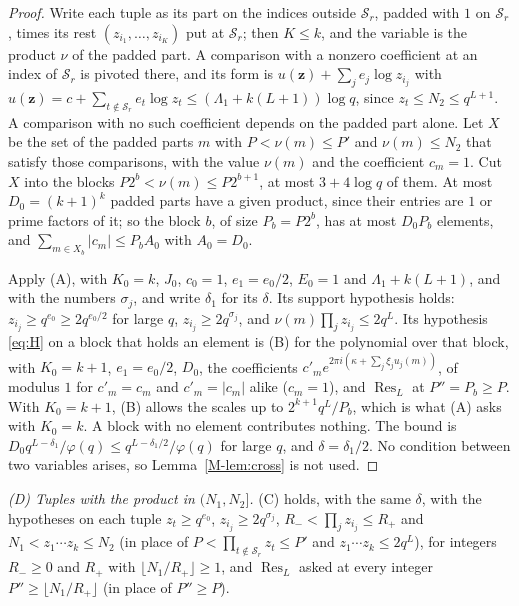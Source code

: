 \documentclass[11pt]{article}
\numberwithin{equation}{section}
\begin{document}
\begin{proof}
Write each tuple as its part on the indices outside $\mathcal S_r$, padded with $1$ on $\mathcal S_r$, times its rest
$(z_{i_1}, \dots, z_{i_K})$ put at $\mathcal S_r$; then $K \le k$, and the variable is the product $\nu$ of the padded
part. A comparison with a nonzero coefficient at an index of $\mathcal S_r$ is pivoted there, and its form is $u(\mathbf
z) + \sum_j e_j \log z_{i_j}$ with $u(\mathbf z) = c + \sum_{t \notin \mathcal S_r} e_t \log z_t \le (\Lambda_1 + k(L +
1))\log q$, since $z_t \le N_2 \le q^{L + 1}$. A comparison with no such coefficient depends on the padded part alone.
Let $X$ be the set of the padded parts $m$ with $P < \nu(m) \le P'$ and $\nu(m) \le N_2$ that satisfy those comparisons,
with the value $\nu(m)$ and the coefficient $c_m = 1$. Cut $X$ into the blocks $P 2^b < \nu(m) \le P 2^{b + 1}$, at most
$3 + 4\log q$ of them. At most $D_0 = (k + 1)^k$ padded parts have a given product, since their entries are $1$ or prime
factors of it; so the block $b$, of size $P_b = P 2^b$, has at most $D_0 P_b$ elements, and $\sum_{m \in X_b} |c_m|
\le P_b A_0$ with $A_0 = D_0$.

Apply (A), with $K_0 = k$, $J_0$, $c_0 = 1$, $e_1 = e_0/2$, $E_0 = 1$ and $\Lambda_1 + k(L + 1)$, and with the numbers
$\sigma_j$, and write $\delta_1$ for its $\delta$. Its support hypothesis holds: $z_{i_j} \ge q^{e_0} \ge
2q^{e_0/2}$ for large $q$, $z_{i_j} \ge 2q^{\sigma_j}$, and $\nu(m) \prod_j z_{i_j} \le 2q^L$. Its hypothesis
\eqref{eq:H} on a block that holds an element is (B) for the polynomial over that block, with $K_0 = k + 1$, $e_1 =
e_0/2$, $D_0$, the coefficients $c'_m e^{2\pi i(\kappa + \sum_j \xi_j u_j(m))}$, of modulus $1$ for $c'_m = c_m$ and
$c'_m = |c_m|$ alike ($c_m = 1$), and $\operatorname{Res}_L$ at $P'' = P_b \ge P$. With $K_0 = k + 1$, (B) allows the
scales up to $2^{k + 1} q^L/P_b$, which is what (A) asks with $K_0 = k$. A block with no element contributes nothing.
The bound is $D_0 q^{L -
\delta_1}/\varphi(q) \le q^{L - \delta_1/2}/\varphi(q)$ for large $q$, and $\delta = \delta_1/2$. No condition between
two variables arises, so Lemma~\ref{M-lem:cross} is not used.
\end{proof}

\emph{(D) Tuples with the product in $(N_1, N_2]$.} (C) holds, with the same $\delta$, with the hypotheses on each
tuple $z_t \ge q^{e_0}$, $z_{i_j} \ge 2q^{\sigma_j}$, $R_- < \prod_j z_{i_j} \le R_+$ and $N_1 < z_1 \cdots z_k \le
N_2$ (in place of $P < \prod_{t \notin \mathcal S_r} z_t \le P'$ and $z_1 \cdots z_k \le 2q^L$), for integers $R_- \ge
0$ and $R_+$ with $\lfloor N_1/R_+ \rfloor \ge 1$, and $\operatorname{Res}_L$ asked at every integer $P'' \ge \lfloor
N_1/R_+ \rfloor$ (in place of $P'' \ge P$).
\end{document}
